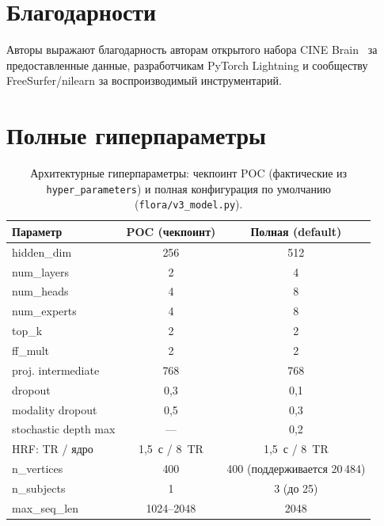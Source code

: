 \documentclass[11pt,a4paper]{article}
\begin{document}
\section*{Благодарности}

Авторы выражают благодарность авторам открытого набора CINE
Brain~\cite{CINEBrain,Gao2025cinebrain} за предоставленные
данные, разработчикам PyTorch Lightning и сообществу
FreeSurfer/nilearn за воспроизводимый инструментарий.




\newpage
\appendix

\section{Полные гиперпараметры}
\label{app:hyper}

\begin{table}[H]
\centering
\caption{Архитектурные гиперпараметры: чекпоинт POC (фактические
из \texttt{hyper\_parameters}) и полная конфигурация по умолчанию
(\texttt{flora/v3\_model.py}).}
\label{tab:app-model}
\small
\begin{tabular}{lcc}
\toprule
Параметр & POC (чекпоинт) & Полная (default) \\
\midrule
hidden\_dim        & 256 & 512 \\
num\_layers        & 2   & 4 \\
num\_heads         & 4   & 8 \\
num\_experts       & 4   & 8 \\
top\_k             & 2   & 2 \\
ff\_mult           & 2   & 2 \\
proj. intermediate & 768 & 768 \\
dropout            & 0{,}3 & 0{,}1 \\
modality dropout   & 0{,}5 & 0{,}3 \\
stochastic depth max & --- & 0{,}2 \\
HRF: TR / ядро     & 1{,}5~с / 8~TR & 1{,}5~с / 8~TR \\
n\_vertices        & 400 & 400 (поддерживается 20\,484) \\
n\_subjects        & 1   & 3 (до 25) \\
max\_seq\_len      & 1024--2048 & 2048 \\
\bottomrule
\end{tabular}
\end{table}
\end{document}
